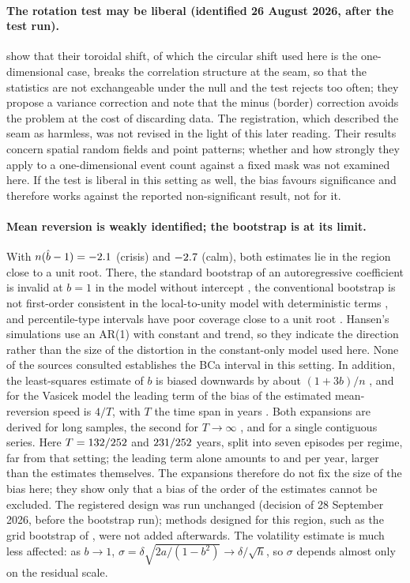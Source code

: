 \documentclass[11pt,a4paper]{article}
\begin{document}
\paragraph{The rotation test may be liberal (identified 26 August 2026, after the test run).} \citet[Sec.~1, 2.1]{mrkvicka2020} show that their toroidal shift, of which the circular shift used here is the one-dimensional case, breaks the correlation structure at the seam, so that the statistics are not exchangeable under the null and the test rejects too often; they propose a variance correction and note that the minus (border) correction avoids the problem at the cost of discarding data. The registration, which described the seam as harmless, was not revised in the light of this later reading. Their results concern spatial random fields and point patterns; whether and how strongly they apply to a one-dimensional event count against a fixed mask was not examined here. If the test is liberal in this setting as well, the bias favours significance and therefore works against the reported non-significant result, not for it.

\paragraph{Mean reversion is weakly identified; the bootstrap is at its limit.} With $n(\hat b-1)=-2.1$ (crisis) and $-2.7$ (calm), both estimates lie in the region close to a unit root. There, the standard bootstrap of an autoregressive coefficient is invalid at $b=1$ in the model without intercept \citep[Sec.~2]{basawa1991}, the conventional bootstrap is not first-order consistent in the local-to-unity model with deterministic terms \citep[Sec.~III.B]{hansen1999}, and percentile-type intervals have poor coverage close to a unit root \citep[Sec.~IV.A, Table~1]{hansen1999}. Hansen's simulations use an AR(1) with constant and trend, so they indicate the direction rather than the size of the distortion in the constant-only model used here. None of the sources consulted establishes the BCa interval in this setting. In addition, the least-squares estimate of $b$ is biased downwards by about $(1+3b)/n$ \citep[eq.~2.7]{tangchen2009}, and for the Vasicek model the leading term of the bias of the estimated mean-reversion speed is $4/T$, with $T$ the time span in years \citep[Thm.~3.2.1]{tangchen2009}. Both expansions are derived for long samples, the second for $T\to\infty$ \citep[eq.~2.1]{tangchen2009}, and for a single contiguous series. Here $T=132/252$ and $231/252$ years, split into seven episodes per regime, far from that setting; the leading term alone amounts to \TCK{} and \TCR{} per year, larger than the estimates themselves. The expansions therefore do not fix the size of the bias here; they show only that a bias of the order of the estimates cannot be excluded. The registered design was run unchanged (decision of 28 September 2026, before the bootstrap run); methods designed for this region, such as the grid bootstrap of \citet{hansen1999}, were not added afterwards. The volatility estimate is much less affected: as $b\to1$, $\sigma=\delta\sqrt{2a/(1-b^2)}\to\delta/\sqrt h$, so $\sigma$ depends almost only on the residual scale.
\end{document}
